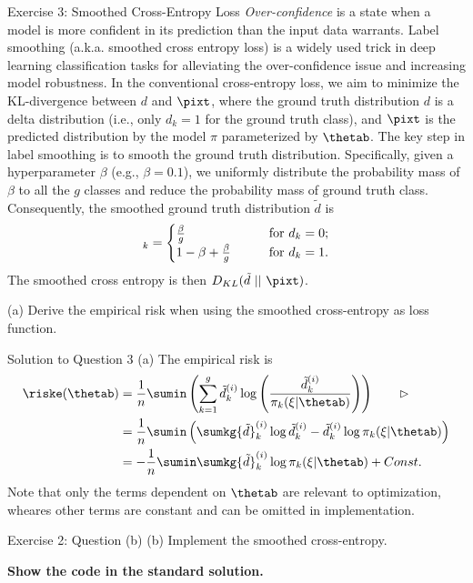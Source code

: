 \documentclass[aspectratio=169]{beamer}
\newcommand{\td}{\tilde{d}}
\newcommand{\tdk}{\title{d}_k}
\newcommand{\tdki}{{\tilde{d}}_k^{(i)}}
\newcommand{\pikxit}{\pi_{k}(\xi | \thetab)}
\begin{document}
\begin{frame}{Exercise 3: Smoothed Cross-Entropy Loss}
	\small
	\emph{Over-confidence} is a state when a model is more confident in its prediction than the input data warrants. Label smoothing (a.k.a. smoothed cross entropy loss) is a widely used trick in deep learning classification tasks for alleviating the over-confidence issue and increasing model robustness. In the conventional cross-entropy loss, we aim to minimize the KL-divergence between $d$ and $\pixt$, where the ground truth distribution $d$ is a delta distribution (i.e., only $d_k = 1$ for the ground truth class), and $\pixt$ is the predicted distribution by the model $\pi$ parameterized by $\thetab$. The key step in label smoothing is to smooth the ground truth distribution. Specifically, given a hyperparameter $\beta$ (e.g., $\beta = 0.1$), we uniformly distribute the probability mass of $\beta$ to all the $g$ classes and reduce the probability mass of ground truth class. Consequently, the smoothed ground truth distribution $\td$ is 
	\begin{align*}
		\tdk = \begin{cases}
			\frac{\beta}{g} \qquad &\text{for } d_k = 0; \\
			1 - \beta + \frac{\beta}{g} \qquad & \text{for } d_k = 1. 
		\end{cases}
	\end{align*}
	The smoothed cross entropy is then $D_{KL}(\td \ || \ \pixt)$. 
	
	(a) Derive the empirical risk when using the smoothed cross-entropy as loss function.
\end{frame}

\begin{frame}{Solution to Question 3 (a)}
	The empirical risk is 
	\begin{align*}
		\riske(\thetab) 
		&= \frac{1}{n} \sumin \left( \sum_{k=1}^g \tdki \log \left( \frac{\tdki}{\pikxit} \right)  \right) \qquad \rhd \\
		&= \frac{1}{n} \sumin \left( \sumkg \tdki \log \tdki - \tdki \log \pikxit  \right) \\
		&= - \frac{1}{n} \sumin \sumkg \tdki \log \pikxit + Const.
	\end{align*}
	Note that only the terms dependent on $\thetab$ are relevant to optimization, wheares other terms are constant and can be omitted in implementation.
\end{frame}

\begin{frame}{Exercise 2: Question (b)}
	(b) Implement the smoothed cross-entropy.
	\vspace{20pt}
	
	\textbf{Show the code in the standard solution.}
\end{frame}
\end{document}
